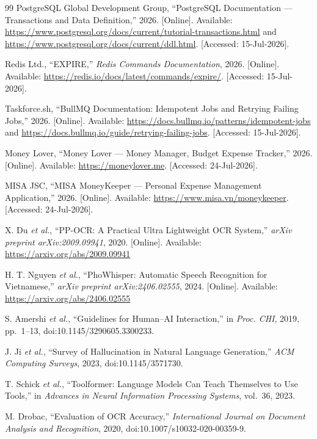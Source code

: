 \begin{thebibliography}{99}
PostgreSQL Global Development Group, ``PostgreSQL Documentation --- Transactions and Data Definition,'' 2026. [Online]. Available: \url{https://www.postgresql.org/docs/current/tutorial-transactions.html} and \url{https://www.postgresql.org/docs/current/ddl.html}. [Accessed: 15-Jul-2026].

Redis Ltd., ``EXPIRE,'' \emph{Redis Commands Documentation}, 2026. [Online]. Available: \url{https://redis.io/docs/latest/commands/expire/}. [Accessed: 15-Jul-2026].

Taskforce.sh, ``BullMQ Documentation: Idempotent Jobs and Retrying Failing Jobs,'' 2026. [Online]. Available: \url{https://docs.bullmq.io/patterns/idempotent-jobs} and \url{https://docs.bullmq.io/guide/retrying-failing-jobs}. [Accessed: 15-Jul-2026].

Money Lover, ``Money Lover --- Money Manager, Budget Expense Tracker,'' 2026. [Online]. Available: \url{https://moneylover.me}. [Accessed: 24-Jul-2026].

MISA JSC, ``MISA MoneyKeeper --- Personal Expense Management Application,'' 2026. [Online]. Available: \url{https://www.misa.vn/moneykeeper}. [Accessed: 24-Jul-2026].

X. Du \emph{et al.}, ``PP-OCR: A Practical Ultra Lightweight OCR System,'' \emph{arXiv preprint arXiv:2009.09941}, 2020. [Online]. Available: \url{https://arxiv.org/abs/2009.09941}

H. T. Nguyen \emph{et al.}, ``PhoWhisper: Automatic Speech Recognition for Vietnamese,'' \emph{arXiv preprint arXiv:2406.02555}, 2024. [Online]. Available: \url{https://arxiv.org/abs/2406.02555}

S. Amershi \emph{et al.}, ``Guidelines for Human--AI Interaction,'' in \emph{Proc. CHI}, 2019, pp.~1--13, doi:10.1145/3290605.3300233.

J. Ji \emph{et al.}, ``Survey of Hallucination in Natural Language Generation,'' \emph{ACM Computing Surveys}, 2023, doi:10.1145/3571730.

T. Schick \emph{et al.}, ``Toolformer: Language Models Can Teach Themselves to Use Tools,'' in \emph{Advances in Neural Information Processing Systems}, vol.~36, 2023.

M. Drobac, ``Evaluation of OCR Accuracy,'' \emph{International Journal on Document Analysis and Recognition}, 2020, doi:10.1007/s10032-020-00359-9.


\end{thebibliography}
